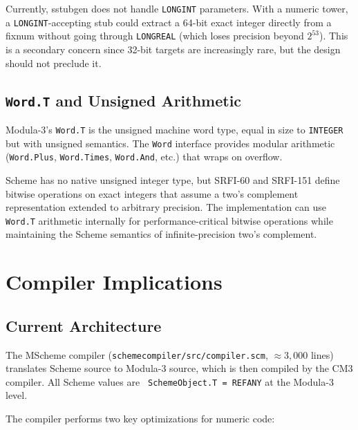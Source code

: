 \documentclass[12pt]{report}
\begin{document}
Currently, sstubgen does not handle {\tt LONGINT} parameters.  With
a numeric tower, a {\tt LONGINT}-accepting stub could extract a 64-bit
exact integer directly from a fixnum without going through {\tt LONGREAL}
(which loses precision beyond $2^{53}$).  This is a secondary concern
since 32-bit targets are increasingly rare, but the design should
not preclude it.

\section{{\tt Word.T} and Unsigned Arithmetic}

Modula-3's {\tt Word.T} is the unsigned machine word type, equal in
size to {\tt INTEGER} but with unsigned semantics.  The {\tt Word}
interface provides modular arithmetic ({\tt Word.Plus}, {\tt Word.Times},
{\tt Word.And}, etc.) that wraps on overflow.

Scheme has no native unsigned integer type, but SRFI-60 and SRFI-151
define bitwise operations on exact integers that assume a two's
complement representation extended to arbitrary precision.  The
implementation can use {\tt Word.T} arithmetic internally for
performance-critical bitwise operations while maintaining the Scheme
semantics of infinite-precision two's complement.

\chapter{Compiler Implications}
\label{ch:compiler}

\section{Current Architecture}

The MScheme compiler ({\tt schemecompiler/src/compiler.scm}, $\approx
3{,}000$ lines) translates Scheme source to Modula-3 source, which is
then compiled by the CM3 compiler.  All Scheme values are {\tt
SchemeObject.T = REFANY} at the Modula-3 level.

The compiler performs two key optimizations for numeric code:
\end{document}
